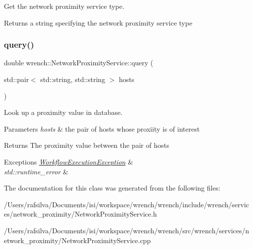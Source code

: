 Get the network proximity service type. 

\begin{DoxyReturn}{Returns}
a string specifying the network proximity service type 
\end{DoxyReturn}
\mbox{\label{classwrench_1_1_network_proximity_service_a3fe7aa39935af1eeeccdd18288f88068}} 
\subsubsection{\texorpdfstring{query()}{query()}}
{\footnotesize\ttfamily double wrench\+::\+Network\+Proximity\+Service\+::query (\begin{DoxyParamCaption}\item[{std\+::pair$<$ std\+::string, std\+::string $>$}]{hosts }\end{DoxyParamCaption})}



Look up a proximity value in database. 


\begin{DoxyParams}{Parameters}
{\em hosts} & the pair of hosts whose proxiity is of interest \\
\hline
\end{DoxyParams}
\begin{DoxyReturn}{Returns}
The proximity value between the pair of hosts
\end{DoxyReturn}

\begin{DoxyExceptions}{Exceptions}
{\em \hyperlink{classwrench_1_1_workflow_execution_exception}{Workflow\+Execution\+Exception}} & \\
\hline
{\em std\+::runtime\+\_\+error} & \\
\hline
\end{DoxyExceptions}


The documentation for this class was generated from the following files\+:\begin{DoxyCompactItemize}
\item 
/\+Users/rafsilva/\+Documents/isi/workspace/wrench/wrench/include/wrench/services/network\+\_\+proximity/Network\+Proximity\+Service.\+h\item 
/\+Users/rafsilva/\+Documents/isi/workspace/wrench/wrench/src/wrench/services/network\+\_\+proximity/Network\+Proximity\+Service.\+cpp\end{DoxyCompactItemize}
